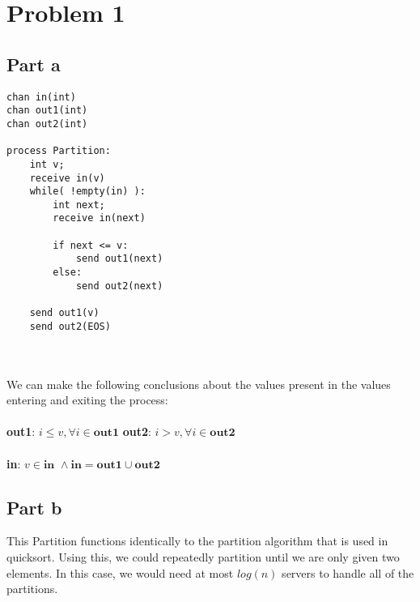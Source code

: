 \documentclass{article}%
\begin{document}
\section*{Problem 1}

\subsection*{Part a}

\lstset{language=Python}
\begin{lstlisting}[frame=single]
chan in(int)
chan out1(int)
chan out2(int)

process Partition:
    int v;
    receive in(v)
    while( !empty(in) ):
        int next;
        receive in(next)

        if next <= v:
            send out1(next)
        else:
            send out2(next)

    send out1(v)
    send out2(EOS)
\end{lstlisting}\\
\\[0.1in]
We can make the following conclusions about the values present in the values entering and exiting the process:\\
\\
\textbf{out1}: $i \leq v, \forall i \in \textbf{out1}$
\hfill
\textbf{out2}: $i > v, \forall i \in \textbf{out2}$\\
\\
\textbf{in}: $v \in \textbf{in } \wedge \textbf{in} = \textbf{out1} \cup \textbf{out2}$

\subsection*{Part b}

This Partition functions identically to the partition algorithm that is used in quicksort. Using this, we could repeatedly
partition until we are only given two elements. In this case, we would need at most $log(n)$ servers to handle all of the
partitions.

\clearpage
\end{document}
